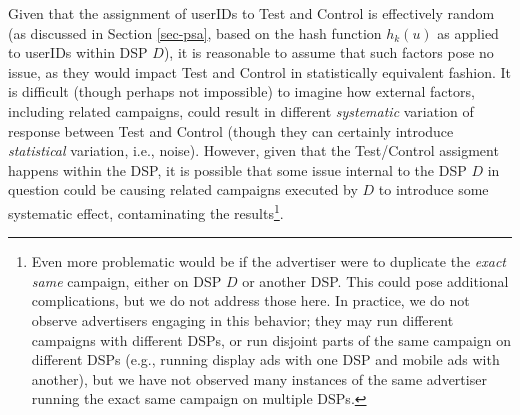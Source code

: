 \documentclass[11pt,a4paper]{article}
\theoremstyle{definition}
\theoremstyle{remark}
\theoremstyle{definition}
\theoremstyle{definition}
\theoremstyle{definition}
\theoremstyle{definition}
\theoremstyle{definition}
\theoremstyle{definition}
\begin{document}
Given that the assignment of userIDs to Test and Control is effectively random (as discussed in Section \ref{sec-psa}, based on the hash function $h_k(u)$ as applied to userIDs within DSP $D$), it is reasonable to assume that such factors pose no issue, as they would impact Test and Control in statistically equivalent fashion. It is difficult (though perhaps not impossible) to imagine how external factors, including related campaigns, could result in different \textit{systematic} variation of response between Test and Control (though they can certainly introduce \textit{statistical} variation, i.e., noise). However, given that the Test/Control assigment happens within the DSP, it is possible that some issue internal to the DSP $D$ in question could be causing related campaigns executed by $D$ to introduce some systematic effect, contaminating the results\footnote{Even more problematic would be if the advertiser were to duplicate the {\em exact same} campaign, either on DSP $D$ or another DSP. This could pose additional complications, but we do not address those here. In practice, we do not observe advertisers engaging in this behavior; they may run different campaigns with different DSPs, or run disjoint parts of the same campaign on different DSPs (e.g., running display ads with one DSP and mobile ads with another), but we have not observed many instances of the same advertiser running the exact same campaign on multiple DSPs.}.
\end{document}
